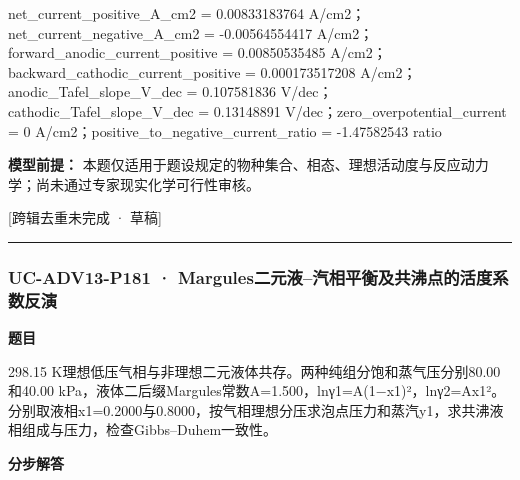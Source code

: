 \documentclass[UTF8,11pt,a4paper]{ctexart}
\begin{document}
net\_current\_positive\_A\_cm2 = 0.00833183764 A/cm2；net\_current\_negative\_A\_cm2 = -0.00564554417 A/cm2；forward\_anodic\_current\_positive = 0.00850535485 A/cm2；backward\_cathodic\_current\_positive = 0.000173517208 A/cm2；anodic\_Tafel\_slope\_V\_dec = 0.107581836 V/dec；cathodic\_Tafel\_slope\_V\_dec = 0.13148891 V/dec；zero\_overpotential\_current = 0 A/cm2；positive\_to\_negative\_current\_ratio = -1.47582543 ratio\par
\noindent\textbf{模型前提：}
本题仅适用于题设规定的物种集合、相态、理想活动度与反应动力学；尚未通过专家现实化学可行性审核。\par
\noindent\textcolor{red!65!black}{[跨辑去重未完成 · 草稿]} \par
\medskip\hrule\medskip
{}
\subsubsection*{UC-ADV13-P181 · Margules二元液–汽相平衡及共沸点的活度系数反演}
\noindent\textbf{题目}\par
298.15 K理想低压气相与非理想二元液体共存。两种纯组分饱和蒸气压分别80.00和40.00 kPa，液体二后缀Margules常数A=1.500，lnγ1=A(1−x1)²，lnγ2=Ax1²。分别取液相x1=0.2000与0.8000，按气相理想分压求泡点压力和蒸汽y1，求共沸液相组成与压力，检查Gibbs–Duhem一致性。\par
\medskip\noindent\textbf{分步解答}
\end{document}
